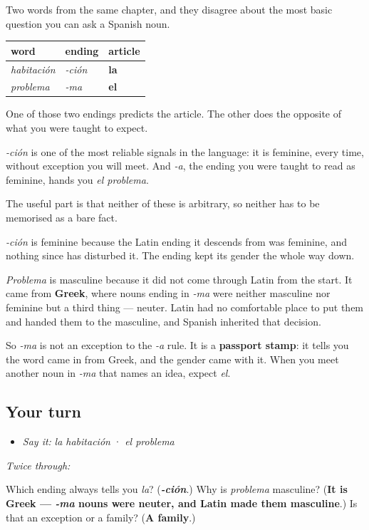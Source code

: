 \begin{grammarlens}[title={What you've built}]
Two words from the same chapter, and they disagree about the most basic question you can ask a Spanish noun.

\noindent
\begin{tabularx}{\linewidth}{@{}>{\raggedright\arraybackslash}X>{\raggedright\arraybackslash}X>{\raggedright\arraybackslash}X@{}}
\toprule
\textbf{word} & \textbf{ending} & \textbf{article} \\
\midrule
\emph{habitación} & \emph{-ción} & \textbf{la} \\
\emph{problema} & \emph{-ma} & \textbf{el} \\
\bottomrule
\end{tabularx}

One of those two endings predicts the article. The other does the opposite of what you were taught to expect.

\emph{-ción} is one of the most reliable signals in the language: it is feminine, every time, without exception you will meet. And \emph{-a}, the ending you were taught to read as feminine, hands you \emph{el problema}.
\end{grammarlens}

\begin{culture}
The useful part is that neither of these is arbitrary, so neither has to be memorised as a bare fact.

\emph{-ción} is feminine because the Latin ending it descends from was feminine, and nothing since has disturbed it. The ending kept its gender the whole way down.

\emph{Problema} is masculine because it did not come through Latin from the start. It came from \textbf{Greek}, where nouns ending in \emph{-ma} were neither masculine nor feminine but a third thing — neuter. Latin had no comfortable place to put them and handed them to the masculine, and Spanish inherited that decision.

So \emph{-ma} is not an exception to the \emph{-a} rule. It is a \textbf{passport stamp}: it tells you the word came in from Greek, and the gender came with it. When you meet another noun in \emph{-ma} that names an idea, expect \emph{el}.
\end{culture}

\subsection*{Your turn}
\begin{itemize}
\raggedright
  \item \emph{Say it:} \emph{la habitación} · \emph{el problema}
\end{itemize}

\emph{Twice through:}

\begin{tcolorbox}[breakable,colback=teal!4,colframe=teal!35!black,title={Before you move on}]
Which ending always tells you \emph{la}? (\emph{\textbf{-ción}}.) Why is \emph{problema} masculine? (\textbf{It is Greek — \emph{-ma} nouns were neuter, and Latin made them masculine}.) Is that an exception or a family? (\textbf{A family}.)
\end{tcolorbox}
